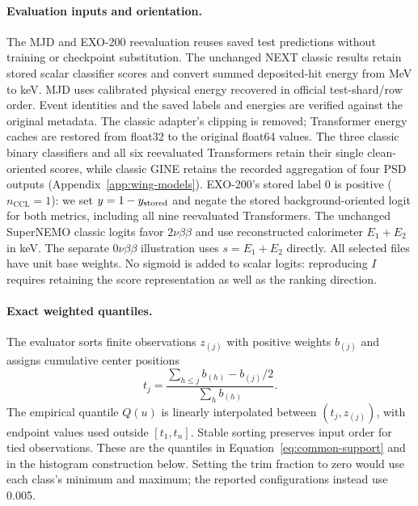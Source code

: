 \paragraph{Evaluation inputs and orientation.}
The MJD and EXO-200 reevaluation reuses saved test predictions without
training or checkpoint substitution. The unchanged NEXT classic results
retain stored scalar classifier scores and convert summed deposited-hit
energy from MeV to keV. MJD uses calibrated physical
energy recovered in official test-shard/row order. Event identities and the
saved labels and energies are verified against the original metadata. The
classic adapter's clipping is removed; Transformer energy caches are restored
from float32 to the original float64 values. The three classic binary
classifiers and all six reevaluated Transformers retain their single
clean-oriented scores, while classic GINE retains the recorded aggregation of four PSD outputs
(Appendix~\ref{app:wing-models}). EXO-200's stored label 0 is positive
($n_{\mathrm{CCL}}=1$): we set $y=1-y_{\rm stored}$ and negate the stored
background-oriented logit for both metrics, including all nine reevaluated
Transformers. The unchanged SuperNEMO classic logits favor
$2\nu\beta\beta$ and use reconstructed calorimeter $E_1+E_2$ in keV.
The separate $0\nu\beta\beta$ illustration uses $s=E_1+E_2$ directly.
All selected files have unit base weights. No sigmoid is added to scalar
logits: reproducing $I$ requires retaining the score representation as well
as the ranking direction.

\paragraph{Exact weighted quantiles.}
The evaluator sorts finite observations $z_{(j)}$ with positive weights
$b_{(j)}$ and assigns cumulative center positions
\begin{equation}
 t_j=\frac{\sum_{h\leq j}b_{(h)}-b_{(j)}/2}{\sum_h b_{(h)}}.
\end{equation}
The empirical quantile $Q(u)$ is linearly interpolated between
$(t_j,z_{(j)})$, with endpoint values used outside $[t_1,t_n]$.
Stable sorting preserves input order for tied observations. These are the
quantiles in Equation~\ref{eq:common-support} and in the histogram
construction below. Setting the trim fraction to zero would use each class's
minimum and maximum; the reported configurations instead use 0.005.

